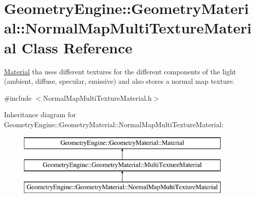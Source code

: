 \hypertarget{class_geometry_engine_1_1_geometry_material_1_1_normal_map_multi_texture_material}{}\section{Geometry\+Engine\+::Geometry\+Material\+::Normal\+Map\+Multi\+Texture\+Material Class Reference}
\label{class_geometry_engine_1_1_geometry_material_1_1_normal_map_multi_texture_material}


\mbox{\hyperlink{class_geometry_engine_1_1_geometry_material_1_1_material}{Material}} tha uses different textures for the different components of the light (ambient, diffuse, specular, emissive) and also stores a normal map texture.  




{\ttfamily \#include $<$Normal\+Map\+Multi\+Texture\+Material.\+h$>$}

Inheritance diagram for Geometry\+Engine\+::Geometry\+Material\+::Normal\+Map\+Multi\+Texture\+Material\+:\begin{figure}[H]
\begin{center}
\leavevmode
\includegraphics[height=3.000000cm]{class_geometry_engine_1_1_geometry_material_1_1_normal_map_multi_texture_material}
\end{center}
\end{figure}
